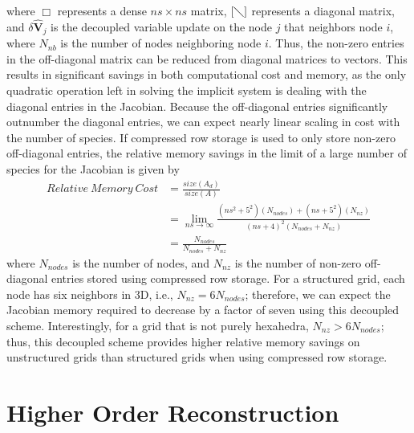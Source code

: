 where $\Box$ represents a dense $ns \times ns$ matrix, $[\diagdown]$ represents
a diagonal matrix, and $\delta \mathbf{\hat{V}}_j$  is the decoupled variable
update on the node $j$ that neighbors node $i$, where $N_{nb}$ is the number of
nodes neighboring node $i$.  Thus, the non-zero entries in the off-diagonal
matrix can be reduced from diagonal matrices to vectors.  This results in
significant savings in both computational cost and memory, as the only quadratic
operation left in solving the implicit system is dealing with the diagonal
entries in the Jacobian.  Because the off-diagonal entries significantly
outnumber the diagonal entries, we can expect nearly linear scaling in cost with
the number of species.  If compressed row storage\cite{George} is used to
only store non-zero off-diagonal entries, the relative memory savings in the
limit of a large number of species for the Jacobian is given by
\begin{equation}
  \label{mem_req_eq}
  \begin{split} 
    Relative\ Memory\ Cost &=
    \frac{size(A_d)}{size(A)} \\ &= \lim_{ns\to\infty}
    \frac{(ns^2+5^2)(N_{nodes})+(ns+5^2)(N_{nz})}{(ns+4)^2(N_{nodes}+N_{nz})} \\
    &= \frac{N_{nodes}}{N_{nodes} + N_{nz}}
  \end{split}
\end{equation}
where $N_{nodes}$ is the number of nodes, and $N_{nz}$ is the number of non-zero
off-diagonal entries stored using compressed row storage. For a structured grid,
each node has six neighbors in 3D, i.e., $N_{nz} = 6N_{nodes}$; therefore, we can
expect the Jacobian memory required to decrease by a factor of seven using this
decoupled scheme. Interestingly, for a grid that is not purely hexahedra,
$N_{nz} > 6N_{nodes}$; thus, this decoupled scheme provides higher relative
memory savings on unstructured grids than structured grids when using compressed
row storage.

\section{Higher Order Reconstruction}
\label{sec:2nd-order-reconstruction}

